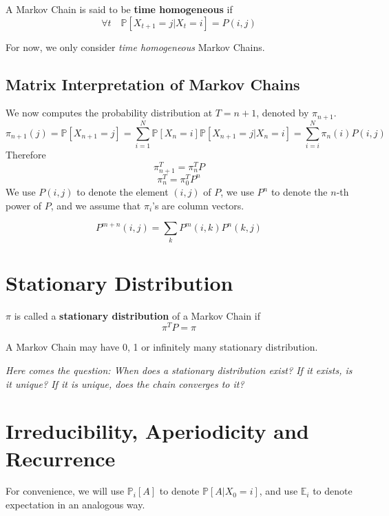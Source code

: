 \begin{definition}
    A Markov Chain is said to be \textbf{time homogeneous} if
    \[ \forall t \quad \mathbb{P}[X_{t+1} = j | X_t = i] = P(i,j) \]
\end{definition}
For now, we only consider \emph{time homogeneous} Markov Chains.

\subsection{Matrix Interpretation of Markov Chains}
We now computes the probability distribution at $T=n+1$, denoted by $\pi_{n+1}$.
\[ \pi_{n+1}(j) = \mathbb{P}[X_{n+1} = j] = \sum_{i=1}^N \mathbb{P}[X_n=i]\mathbb{P}[X_{n+1} = j | X_n = i] = \sum_{i=i}^N \pi_n(i)P(i,j)\]
Therefore
\[ \pi_{n+1}^T = \pi_n^T P \]
\[ \pi_n^T = \pi_0^T P^n \]
We use $P(i,j)$ to denote the element $(i,j)$ of $P$, we use $P^n$ to denote the $n$-th power of $P$, and we assume that $\pi_i$'s are column vectors.

\begin{theorem}
    \[ P^{m+n}(i,j) = \sum_k P^m(i,k)P^n(k,j) \]
\end{theorem}

\section{Stationary Distribution}
\begin{definition}
    $\pi$ is called a \textbf{stationary distribution} of a Markov Chain if
    \[ \pi^TP = \pi \]
\end{definition}
\begin{remark}
    A Markov Chain may have 0, 1 or infinitely many stationary distribution.
\end{remark}

\emph{Here comes the question: When does a stationary distribution exist? If it exists, is it unique? If it is unique, does the chain converges to it?}

\section{Irreducibility, Aperiodicity and Recurrence}
For convenience, we will use $\mathbb{P}_i[A]$ to denote $\mathbb{P}[A | X_0 = i]$, and use $\mathbb{E}_i$ to denote expectation in an analogous way.

